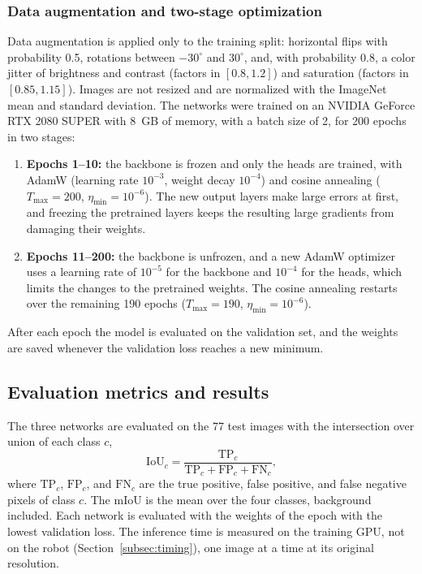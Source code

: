 \subsubsection{Data augmentation and two-stage optimization}
Data augmentation is applied only to the training split: horizontal flips with probability 0.5, rotations between $-30^\circ$ and $30^\circ$, and, with probability 0.8, a color jitter of brightness and contrast (factors in $[0.8, 1.2]$) and saturation (factors in $[0.85, 1.15]$). Images are not resized and are normalized with the ImageNet mean and standard deviation. The networks were trained on an NVIDIA GeForce RTX 2080 SUPER with 8~GB of memory, with a batch size of 2, for 200 epochs in two stages:
\begin{enumerate}
    \item \textbf{Epochs 1--10:} the backbone is frozen and only the heads are trained, with AdamW (learning rate $10^{-3}$, weight decay $10^{-4}$) and cosine annealing ($T_{\text{max}} = 200$, $\eta_{\text{min}} = 10^{-6}$). The new output layers make large errors at first, and freezing the pretrained layers keeps the resulting large gradients from damaging their weights.
    \item \textbf{Epochs 11--200:} the backbone is unfrozen, and a new AdamW optimizer uses a learning rate of $10^{-5}$ for the backbone and $10^{-4}$ for the heads, which limits the changes to the pretrained weights. The cosine annealing restarts over the remaining 190 epochs ($T_{\text{max}} = 190$, $\eta_{\text{min}} = 10^{-6}$).
\end{enumerate}

After each epoch the model is evaluated on the validation set, and the weights are saved whenever the validation loss reaches a new minimum.

\subsection{Evaluation metrics and results}
\label{subsec:c4_architecture_results}

The three networks are evaluated on the 77 test images with the intersection over union of each class $c$,
\begin{equation}
    \text{IoU}_c = \frac{\text{TP}_c}{\text{TP}_c + \text{FP}_c + \text{FN}_c},
    \label{eq:eval_iou}
\end{equation}
where $\text{TP}_c$, $\text{FP}_c$, and $\text{FN}_c$ are the true positive, false positive, and false negative pixels of class $c$. The mIoU is the mean over the four classes, background included. Each network is evaluated with the weights of the epoch with the lowest validation loss. The inference time is measured on the training GPU, not on the robot (Section~\ref{subsec:timing}), one image at a time at its original resolution.

